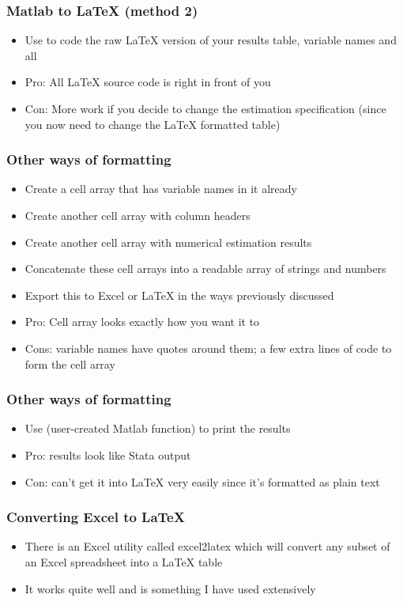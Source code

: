 \documentclass[english,xcolor=dvipsnames]{beamer}
\newcommand{\bi}{\begin{itemize}}
\newcommand{\ei}{\end{itemize}}
\begin{document}
\begin{frame}
\frametitle{Matlab to LaTeX (method 2)}
   \bi 
   \item Use  to code the raw LaTeX version of your results table, variable names and all
   \item Pro: All LaTeX source code is right in front of you
   \item Con: More work if you decide to change the estimation specification (since you now need to change the LaTeX formatted table)
   \ei
\end{frame}

\begin{frame}
\frametitle{Other ways of formatting}
   \bi 
   \item Create a cell array that has variable names in it already
   \item Create another cell array with column headers
   \item Create another cell array with numerical estimation results
   \item Concatenate these cell arrays into a readable array of strings and numbers
   \item Export this to Excel or LaTeX in the ways previously discussed
   \item Pro: Cell array looks exactly how you want it to
   \item Cons: variable names have quotes around them; a few extra lines of code to form the cell array
   \ei
\end{frame}

\begin{frame}
\frametitle{Other ways of formatting}
   \bi 
   \item Use  (user-created Matlab function) to print the results
   \item Pro: results look like Stata output
   \item Con: can't get it into LaTeX very easily since it's formatted as plain text
   \ei
\end{frame}

\begin{frame}
\frametitle{Converting Excel to LaTeX}
   \bi 
   \item There is an Excel utility called excel2latex which will convert any subset of an Excel spreadsheet into a LaTeX table
   \item It works quite well and is something I have used extensively
   \ei
\end{frame}
\end{document}
